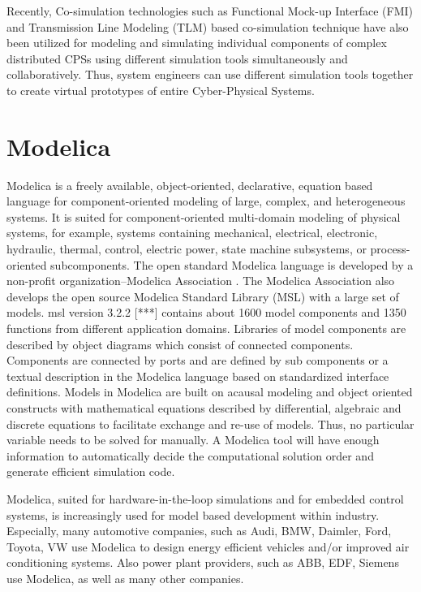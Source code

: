 Recently, Co-simulation technologies such as Functional Mock-up Interface (FMI) \cite{fmi, fmiblochwitz} and Transmission Line Modeling (TLM) based co-simulation technique \cite{tlmkurs90,tlmcogan,tlmjohns,tlmkurs99} have also been utilized for modeling and  simulating individual components of complex distributed  CPSs using different simulation tools simultaneously and collaboratively. Thus, system engineers can use different simulation tools together to create virtual prototypes of entire Cyber-Physical Systems. 

\section{Modelica}
\label{sec:modelica}


Modelica \cite{modelica, modelicapeterbook, modelicapeter} is a freely available, object-oriented, declarative, equation based language for component-oriented modeling of large, complex, and heterogeneous systems.  It is suited for component-oriented multi-domain modeling of physical systems, for example, systems containing mechanical, electrical, electronic, hydraulic, thermal, control, electric power, state machine subsystems, or process-oriented subcomponents. 
The open standard Modelica language is developed by a non-profit organization–Modelica Association \cite{modelicaassociation}. The Modelica Association also develops the open source Modelica Standard Library (MSL) \cite{modelicamsl} with a large set of models. \acrshort{msl} version 3.2.2 [***] contains about 1600 model components and 1350 functions from different application domains. Libraries of model components are described by object diagrams which consist of connected components. Components are connected by ports and are defined by sub components or a textual description in the Modelica language based on standardized interface definitions.
Models in Modelica are built on acausal modeling and object oriented constructs with mathematical equations described by differential, algebraic and discrete equations to facilitate exchange and re-use of models. Thus, no particular variable needs to be solved for manually. A Modelica tool will have enough information to automatically decide the computational solution order and generate efficient simulation code.

Modelica, suited for hardware-in-the-loop simulations and for embedded control systems, is increasingly used for model based development within industry. Especially, many automotive companies, such as Audi, BMW, Daimler, Ford, Toyota, VW use Modelica to design energy efficient vehicles and/or improved air conditioning systems. Also power plant providers, such as ABB, EDF, Siemens use Modelica, as well as many other companies.

